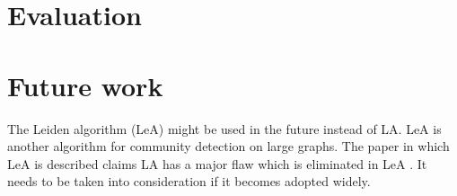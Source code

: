 \section{Evaluation}

\section{Future work}
The Leiden algorithm (LeA) might be used in the future instead of LA. LeA is another algorithm for community detection on large graphs. The paper in which LeA is described claims LA has a major flaw which is eliminated in LeA \cite{leidenAlgorithm}. It needs to be taken into consideration if it becomes adopted widely. 
